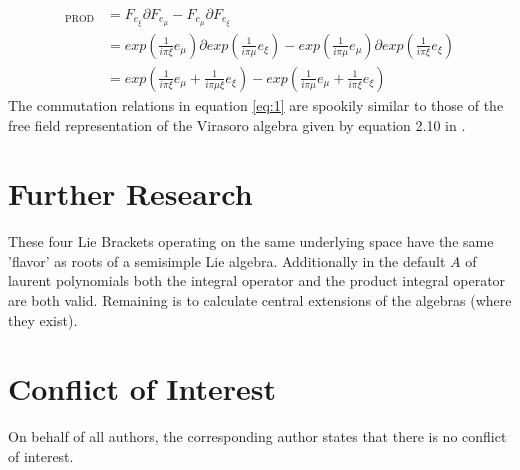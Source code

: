 \documentclass{artjlt}
\newcommand{\?}{\textbackslash}
\begin{document}
      \begin{align}
          [e_\xi, e_\mu]_\text{PROD} &= F_{e_{\xi}} \partial F_{e_{\mu}} - F_{e_{\mu}} \partial F_{e_{\xi}} \nonumber \\
          &= exp(\frac{1}{i \pi \xi}e_\mu) \partial exp(\frac{1}{i \pi \mu} e_\xi) - exp(\frac{1}{i \pi \mu}e_\mu) \partial exp(\frac{1}{i \pi \xi} e_\xi) \nonumber \\
          &= exp(\frac{1}{i \pi \xi}e_\mu + \frac{1}{i \pi \mu \xi} e_\xi)- exp(\frac{1}{i \pi \mu}e_\mu+\frac{1}{i \pi \xi}e_\xi) \label{eq:1}
      \end{align}
      The commutation relations in equation \ref{eq:1} are spookily similar to those of the free field representation of the Virasoro algebra given by equation 2.10 in \cite{teschner2017guidetwodimensionalconformalfield}.
   \section{Further Research}
   These four Lie Brackets operating on the same underlying space have the same 'flavor' as roots of a semisimple Lie algebra. 
   Additionally in the default $A$ of laurent polynomials both the integral operator and the product integral operator are both valid. 
   Remaining is to calculate central extensions of the algebras (where they exist).
\section*{Conflict of Interest}
On behalf of all authors, the corresponding author states that there is no conflict of interest.
\end{document}
